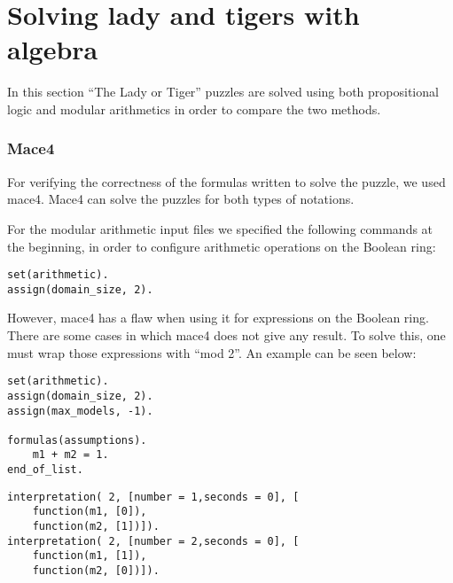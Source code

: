 \section{Solving lady and tigers with algebra} 
\label{sec:puzzles}

In this section ``The Lady or Tiger'' puzzles are solved using both propositional logic and modular arithmetics in order to compare the two methods.

\subsubsection{Mace4}
\label{sec:mace4_flaw}

For verifying the correctness of the formulas written to solve the puzzle, we used mace4. Mace4 can solve the puzzles for both types of notations.

For the modular arithmetic input files we specified the following commands at the beginning, in order to configure arithmetic operations on the Boolean ring:

\begin{lstlisting}[numbers=none]
set(arithmetic).
assign(domain_size, 2).
\end{lstlisting}

However, mace4 has a flaw when using it for expressions on the Boolean ring. There are some cases in which mace4 does not give any result. To solve this, one must wrap those expressions with ``mod 2''. An example can be seen below:

\begin{multicols}{2}

\begin{lstlisting}[numbers=none,title=Input file that can be solved by Mace4]
set(arithmetic).
assign(domain_size, 2).
assign(max_models, -1).

formulas(assumptions). 
    m1 + m2 = 1.
end_of_list.
\end{lstlisting}

\columnbreak

\begin{lstlisting}[numbers=none,title=Mace4 output]
interpretation( 2, [number = 1,seconds = 0], [
    function(m1, [0]),
    function(m2, [1])]).
interpretation( 2, [number = 2,seconds = 0], [
    function(m1, [1]),
    function(m2, [0])]).
\end{lstlisting}

\end{multicols}



